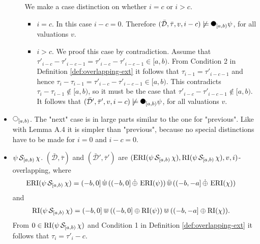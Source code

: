 \begin{itemize}
\begin{itemize}
                We make a case distinction on whether $i=c$ or $i>c$.
                \begin{itemize}
                    \item
                        $i=c$.
                        In this case $i-c = 0$.
                        Therefore $(\bar{\mathcal{D}}, \bar{\tau}, v, i-c) \not\models \Previous{[a,b)} \psi$, for all valuations $v$.
                    \item
                        $i>c$.
                        We proof this case by contradiction.
                        Assume that $\tau'_{i-c} - \tau'_{i-c-1} = \tau'_{i-c} - \tau'_{i-c-1} \in [a,b)$.
                        From Condition 2 in Definition \ref{def:overlapping-ext} it follows that $\tau_{i-1} = \tau'_{i-c-1}$ and hence $\tau_i - \tau_{i-1} = \tau'_{i-c} - \tau'_{i-c-1} \in [a,b)$.
                        This contradicts $\tau_i - \tau_{i-1} \not\in [a,b)$, so it must be the case that $\tau'_{i-c} - \tau'_{i-c-1} \not\in [a,b)$.
                        It follows that $(\bar{\mathcal{D}}', \bar{\tau}', v, i-c) \not\models \Previous{[a,b)} \psi$, for all valuations $v$.
                \end{itemize}
        \end{itemize}
    \item
        $\Next{[a,b)}$.
        The "next" case is in large parts similar to the one for "previous".
        Like with Lemma A.4 \cite{Basin2016} it is simpler than "previous", because no special distinctions have to be made for $i=0$ and $i-c=0$.
    \item
        $\psi \,\mathcal{S}_{[a,b)}\, \chi$.
        $(\bar{\mathcal{D}},\bar{\tau})$ and $(\bar{\mathcal{D}}',\bar{\tau}')$ are $(\operatorname{ERI}(\psi \,\mathcal{S}_{[a,b)}\, \chi), \operatorname{RI}(\psi \,\mathcal{S}_{[a,b)}\, \chi), v, i)$- overlapping, where
        \begin{align*}
            \operatorname{ERI}(\psi \,\mathcal{S}_{[a,b)}\, \chi)
            &= (-b,0] \,\dot{\Cup}\, ((-b,0] \,\dot{\oplus}\, \operatorname{ERI}(\psi)) \,\ddot{\Cup}\, ((-b,-a] \,\dot{\oplus}\, \operatorname{ERI}(\chi))
        \end{align*}
        and
        \begin{align*}
            \operatorname{RI}(\psi \,\mathcal{S}_{[a,b)}\, \chi)
            &= (-b,0] \Cup ((-b,0] \oplus \operatorname{RI}(\psi)) \Cup ((-b,-a] \oplus \operatorname{RI}(\chi)).
        \end{align*}
        From $0 \in \operatorname{RI}(\psi \,\mathcal{S}_{[a,b)}\, \chi)$ and Condition 1 in Definition \ref{def:overlapping-ext} it follows that $\tau_i = \tau'_i-c$.


\end{itemize}

